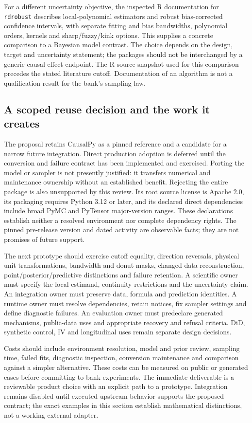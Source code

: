 For a different uncertainty objective, the inspected R documentation for
\texttt{rdrobust} describes local-polynomial estimators and robust bias-corrected
confidence intervals, with separate fitting and bias bandwidths, polynomial
orders, kernels and sharp/fuzzy/kink options. This supplies a concrete comparison
to a Bayesian model contrast. The choice depends on the design, target and
uncertainty statement; the packages should not be interchanged by a generic
causal-effect endpoint. The R source snapshot used for this comparison
precedes the stated literature cutoff. Documentation of an algorithm is not a
qualification result for the bank's sampling law.\citep{v12_sw_rdrobust}

\subsection{A scoped reuse decision and the work it creates}

The proposal retains CausalPy as a pinned reference and a candidate for a narrow
future integration. Direct production adoption is deferred until the conversion
and failure contract has been implemented and exercised. Porting the model or
sampler is not presently justified: it transfers numerical and maintenance
ownership without an established benefit. Rejecting the entire package is also
unsupported by this review. Its root source license is Apache 2.0, its packaging
requires Python 3.12 or later, and its declared direct dependencies include broad
PyMC and PyTensor major-version ranges. These declarations establish neither a
resolved environment nor complete dependency rights. The pinned pre-release
version and dated activity are observable facts; they are not promises of future
support.\citep{exec14_causalpy_primary,exec14_causalpy_decision}

The next prototype should exercise cutoff equality, direction reversals, physical
unit transformations, bandwidth and donut masks, changed-data reconstruction,
point/posterior/predictive distinctions and failure retention. A scientific owner
must specify the local estimand, continuity restrictions and the uncertainty
claim. An integration owner must preserve data, formula and prediction identities.
A runtime owner must resolve dependencies, retain notices, fix sampler settings
and define diagnostic failures. An evaluation owner must predeclare generated
mechanisms, public-data uses and appropriate recovery and refusal criteria.
DiD, synthetic control, IV and longitudinal uses remain separate design decisions.
\citep{exec14_causalpy_decision}

Costs should include environment resolution, model and prior review, sampling
time, failed fits, diagnostic inspection, conversion maintenance and comparison
against a simpler alternative. These costs can be measured on public or generated
cases before committing to bank experiments. The immediate deliverable is a
reviewable product choice with an explicit path to a prototype. Integration
remains disabled until executed upstream behavior supports the proposed contract;
the exact examples in this section establish mathematical distinctions, not a
working external adapter.\citep{exec14_causalpy_decision}
\label{exec14:causalpy-contract-end}
